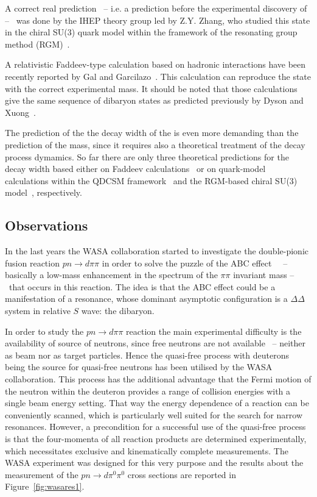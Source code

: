 A correct real prediction \ -- i.e. a prediction before the experimental discovery of \dst -- \ was done 
by the IHEP theory group led by Z.Y. Zhang, who studied this state in the chiral SU(3) quark model within
the framework of the resonating group method (RGM)~\cite{dsqm2}.

A relativistic Faddeev-type calculation based on hadronic interactions have been recently reported by
Gal and Garcilazo~\cite{reanalysis,haddin,haddin1}. This calculation can reproduce the \ds state
with the correct experimental mass.
It should be noted that those calculations give the same sequence of dibaryon states as predicted previously
by Dyson and Xuong~\cite{dysonxuong}.

The prediction of the the decay width of the \dst is even more demanding than the prediction of the mass, since
it requires also a theoretical treatment of the decay process dymamics.
So far there are only three theoretical predictions for the decay width based either on Faddeev
calculations~\cite{reanalysis,haddin,haddin1} or on quark-model calculations within the
QDCSM  framework~\cite{widthpred1,dsqm1} and the RGM-based chiral SU(3) 
model~\cite{widthpred2,widthpred3}, respectively.

%
\subsection{Observations} \label{sec:2.2.2}

In the last years the WASA collaboration started to investigate the double-pionic fusion reaction 
$pn \rightarrow d \pi \pi$ in order to solve the puzzle of the ABC effect~\cite{abc} \ -- basically
a low-mass enhancement in the spectrum of the $\pi \pi$ invariant mass -- \ that occurs in this
reaction.
The idea is that the ABC effect could be a manifestation of a resonance, whose dominant asymptotic
configuration is a $\Delta \Delta$ system in relative $S$ wave: the \ds dibaryon.

In order to study the $pn \rightarrow d \pi \pi$ reaction the main experimental difficulty is the availability of source of
neutrons, since free neutrons are not available \ -- neither as beam nor as target particles. 
Hence the quasi-free process with deuterons being the source for quasi-free neutrons has been utilised
by the WASA collaboration.
This process has the additional advantage that the Fermi motion of the neutron within the deuteron 
provides a range of collision energies with a single beam energy setting.
That way the energy dependence of a reaction can be conveniently scanned, which is particularly well
suited for the search for narrow resonances.
However, a precondition for a successful use of the quasi-free process is that the four-momenta of all
reaction products are determined experimentally, which necessitates exclusive and kinematically complete
measurements.
The WASA experiment was designed for this very purpose and the results about the measurement 
of the $pn \rightarrow d \pi^{0} \pi^{0}$ cross sections are reported in Figure~\ref{fig:wasares1}.

